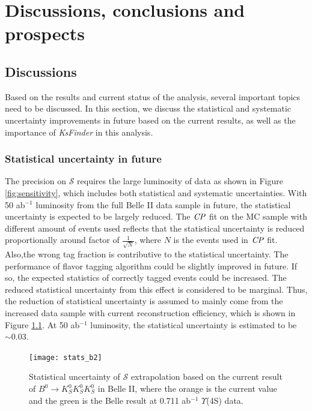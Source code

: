 \chapter{Discussions, conclusions and prospects}


\section{Discussions}
Based on the results and current status of the analysis, several important topics need to be discussed. In this section, we discuss the statistical and systematic uncertainty improvements in future based on the current results, as well as the importance of \textit{KsFinder} in this analysis. 
\subsection{Statistical uncertainty in future}
The precision on $\mathcal{S}$ requires the large luminosity of data as shown in Figure \ref{fig:sensitivity}, which includes both statistical and systematic uncertainties. With 50 ab$^{-1}$ luminosity from the full Belle II data sample in future, the statistical uncertainty is expected to be largely reduced. The $\it{CP}$ fit on the MC sample with different amount of events used reflects that the statistical uncertainty is reduced proportionally around factor of $\frac{1}{\sqrt{N}}$, where $N$ is the events used in $\it{CP}$ fit. Also,the wrong tag fraction is contributive to the statistical uncertainty. The performance of flavor tagging algorithm could be slightly improved in future. If so, the expected statistics of correctly tagged events could be increased. The reduced statistical uncertainty from this effect is considered to be marginal. Thus, the reduction of statistical uncertainty is assumed to mainly come from the increased data sample with current reconstruction efficiency, which is shown in Figure \ref{fig:stats_future}. At 50 ab$^{-1}$ luminosity, the statistical uncertainty is estimated to be $\sim 0.03$.

\begin{figure}[htpb]
	\centering
	\texttt{[image: stats\_b2]}
	\caption{Statistical uncertainty of $\mathcal{S}$ extrapolation based on the current result of $B^0 \to K_S^0  K_S^0  K_S^0$ in Belle II, where the orange is the current value and the green is the Belle result at 0.711 ab$^{-1}$ $\Upsilon$(4S) data.}
	\label{fig:stats_future}
\end{figure}

